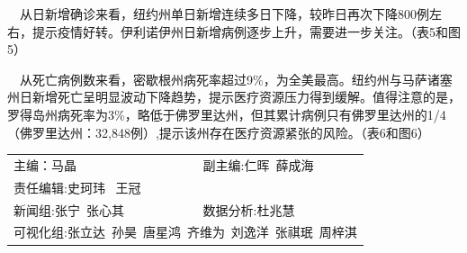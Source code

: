 \documentclass[]{article}
\begin{document}
\(\quad\)从日新增确诊来看，纽约州单日新增连续多日下降，较昨日再次下降800例左右，提示疫情好转。伊利诺伊州日新增病例逐步上升，需要进一步关注。（表5和图5）

\(\quad\)从死亡病例数来看，密歇根州病死率超过9\%，为全美最高。纽约州与马萨诸塞州日新增死亡呈明显波动下降趋势，提示医疗资源压力得到缓解。值得注意的是，罗得岛州病死率为3\%，略低于佛罗里达州，但其累计病例只有佛罗里达州的1/4（佛罗里达州：32,848例）,提示该州存在医疗资源紧张的风险。（表6和图6）

\vspace{5mm}

\centering
\small
\begin{tabular}{ll}

主编：马晶  &  副主编:仁晖\,  薛成海  \\
责任编辑:史珂玮 \, 王冠  \\
新闻组:张宁\, 张心其  & 数据分析:杜兆慧 \\
\multicolumn{2}{l}{可视化组:张立达\, 孙昊\, 唐星鸿\, 齐维为\, 刘逸洋\, 张祺珉\, 周梓淇}

\end{tabular}
\end{document}
